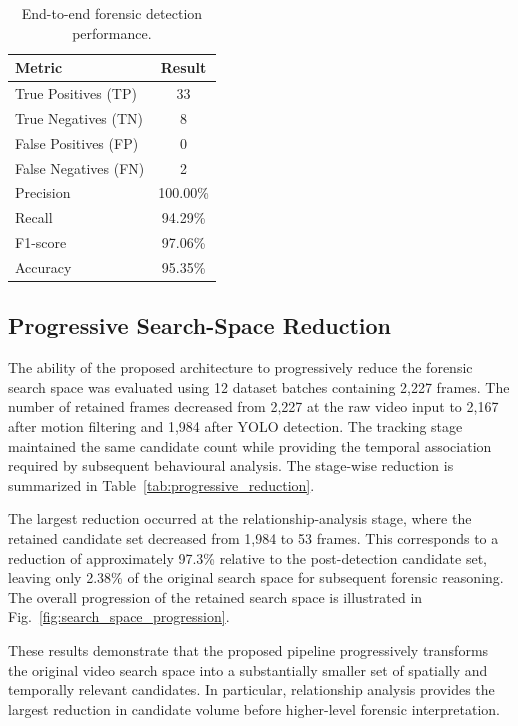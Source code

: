 \documentclass[runningheads]{llncs}
\begin{document}
\begin{table}[htbp]
\centering
\caption{End-to-end forensic detection performance.}
\label{tab:end_to_end_performance}
\begin{tabular}{lc}
\hline
\textbf{Metric} & \textbf{Result} \\
\hline
True Positives (TP) & 33 \\
True Negatives (TN) & 8 \\
False Positives (FP) & 0 \\
False Negatives (FN) & 2 \\
Precision & 100.00\% \\
Recall & 94.29\% \\
F1-score & 97.06\% \\
Accuracy & 95.35\% \\
\hline
\end{tabular}
\end{table}

\subsection{Progressive Search-Space Reduction}

The ability of the proposed architecture to progressively reduce the
forensic search space was evaluated using 12 dataset batches containing
2,227 frames. The number of retained frames decreased from 2,227 at the
raw video input to 2,167 after motion filtering and 1,984 after YOLO
detection. The tracking stage maintained the same candidate count while
providing the temporal association required by subsequent behavioural
analysis. The stage-wise reduction is summarized in
Table~\ref{tab:progressive_reduction}.

The largest reduction occurred at the relationship-analysis stage,
where the retained candidate set decreased from 1,984 to 53 frames.
This corresponds to a reduction of approximately 97.3\% relative to the
post-detection candidate set, leaving only 2.38\% of the original
search space for subsequent forensic reasoning. The overall progression
of the retained search space is illustrated in
Fig.~\ref{fig:search_space_progression}.


These results demonstrate that the proposed pipeline progressively
transforms the original video search space into a substantially smaller
set of spatially and temporally relevant candidates. In particular,
relationship analysis provides the largest reduction in candidate volume
before higher-level forensic interpretation.
\end{document}
